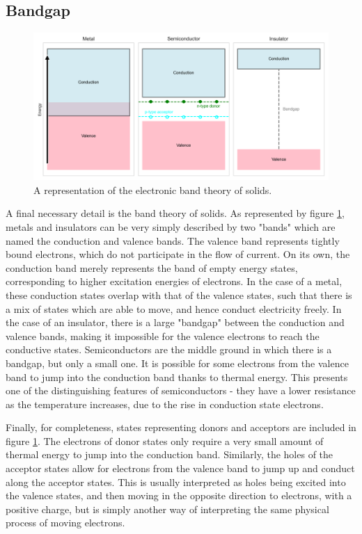 \begin{refsection}
\subsection{Bandgap}
\begin{figure}[H]
\centering
\includegraphics[width=\linewidth]{Chapter1/gfx/bandgap_chap1_1.png}
\caption{A representation of the electronic band theory of solids.}
\label{fig:bandgap_metaletc}
\end{figure}
A final necessary detail is the band theory of solids. As represented by figure \ref{fig:bandgap_metaletc}, metals and insulators can be very simply described by two "bands" which are named the conduction and valence bands. The valence band represents tightly bound electrons, which do not participate in the flow of current. On its own, the conduction band merely represents the band of empty energy states, corresponding to higher excitation energies of electrons. In the case of a metal, these conduction states overlap with that of the valence states, such that there is a mix of states which are able to move, and hence conduct electricity freely. In the case of an insulator, there is a large "bandgap" between the conduction and valence bands, making it impossible for the valence electrons to reach the conductive states. Semiconductors are the middle ground in which there is a bandgap, but only a small one. It is possible for some electrons from the valence band to jump into the conduction band thanks to thermal energy. This presents one of the distinguishing features of semiconductors - they have a lower resistance as the temperature increases, due to the rise in conduction state electrons.

Finally, for completeness, states representing donors and acceptors are included in figure \ref{fig:bandgap_metaletc}. The electrons of donor states only require a very small amount of thermal energy to jump into the conduction band. Similarly, the holes of the acceptor states allow for electrons from the valence band to jump up and conduct along the acceptor states. This is usually interpreted as holes being excited into the valence states, and then moving in the opposite direction to electrons, with a positive charge, but is simply another way of interpreting the same physical process of moving electrons.



\end{refsection}
